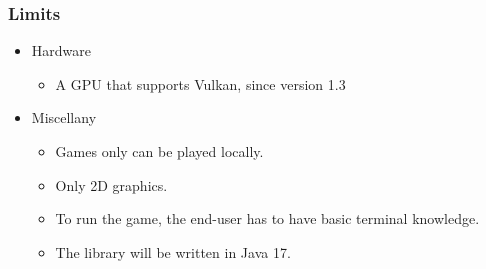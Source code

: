 \subsubsection{Limits}
\begin{itemize}
    \item Hardware
    \begin{itemize}
        \item A GPU that supports Vulkan, since version 1.3
    \end{itemize}
    \item Miscellany
    \begin{itemize}
        \item Games only can be played locally.
        \item Only 2D graphics.
        \item To run the game, the end-user has to have basic terminal knowledge.
        \item The library will be written in Java 17.
    \end{itemize}
\end{itemize}
